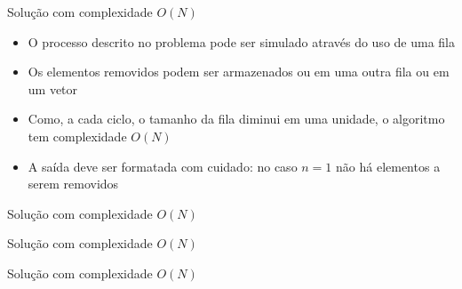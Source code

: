 \begin{frame}[fragile]{Solução com complexidade $O(N)$}

    \begin{itemize}
        \item O processo descrito no problema pode ser simulado através do uso de uma fila

        \item Os elementos removidos podem ser armazenados ou em uma outra fila ou em um
            vetor

        \item Como, a cada ciclo, o tamanho da fila diminui em uma unidade, o algoritmo tem
            complexidade $O(N)$

        \item A saída deve ser formatada com cuidado: no caso $n = 1$ não há elementos a serem
            removidos
   \end{itemize}

\end{frame}

\begin{frame}[fragile]{Solução com complexidade $O(N)$}
\end{frame}

\begin{frame}[fragile]{Solução com complexidade $O(N)$}
\end{frame}

\begin{frame}[fragile]{Solução com complexidade $O(N)$}
\end{frame}
